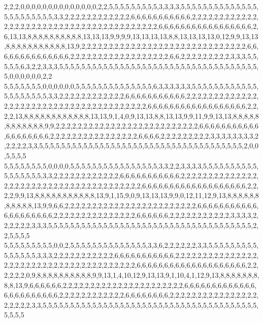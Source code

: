 2,2,2,0,0,0,0,0,0,0,0,0,0,0,0,0,0,2,2,5,5,5,5,5,5,5,5,5,3,3,3,3,5,5,5,5,5,5,5,5,5,5,5,5,5,5,5,5,5,5,5,5,5,5,5,3,3,2,2,2,2,2,2,2,2,2,2,2,2,6,6,6,6,6,6,6,6,6,6,6,2,2,2,2,2,2,2,2,2,2,2,2,2,2,2,2,2,2,2,2,2,2,2,2,2,2,2,2,2,2,2,2,2,2,2,2,2,2,2,2,6,6,6,6,6,6,6,6,6,6,6,6,6,6,6,6,6,2,6,13,13,8,8,8,8,8,8,8,8,8,8,13,13,13,9,9,9,9,13,13,13,13,8,8,13,13,13,13,0,12,9,9,13,13,8,8,8,8,8,8,8,8,8,8,8,13,9,2,2,2,2,2,2,2,2,2,2,2,2,2,2,2,2,2,2,2,2,2,2,2,2,2,2,2,2,2,2,6,6,6,6,6,6,6,6,6,6,6,6,6,6,2,2,2,2,2,2,2,2,2,2,2,2,2,2,2,2,2,2,6,6,2,2,2,2,2,2,2,2,2,3,3,3,5,5,5,5,5,6,3,2,2,3,3,3,5,5,5,5,5,5,5,5,5,5,5,5,5,5,5,5,5,5,5,5,5,5,5,5,5,5,5,5,5,5,5,5,5,5,5,5,5,0,0,0,0,0,0,2,2
5,5,5,5,5,5,5,0,0,0,0,0,0,5,5,5,5,5,5,5,5,5,5,5,5,5,5,6,3,3,3,3,3,3,5,5,5,5,5,5,5,5,5,5,5,5,5,5,5,5,5,5,5,5,3,3,2,2,2,2,2,2,2,2,2,2,2,2,6,6,6,6,6,6,6,6,6,6,6,2,2,2,2,2,2,2,2,2,2,2,2,2,2,2,2,2,2,2,2,2,2,2,2,2,2,2,2,2,2,2,2,2,2,2,2,2,2,2,6,6,6,6,6,6,6,6,6,6,6,6,6,6,6,6,6,6,2,2,2,2,13,8,8,8,8,8,8,8,8,8,8,8,8,13,13,9,1,4,0,9,13,13,8,8,13,13,9,9,11,9,9,13,13,8,8,8,8,8,8,8,8,8,8,8,8,9,9,2,2,2,2,2,2,2,2,2,2,2,2,2,2,2,2,2,2,2,2,2,2,2,2,2,2,6,6,6,6,6,6,6,6,6,6,6,6,6,6,6,6,6,6,6,2,2,2,2,2,2,2,2,2,2,2,2,2,2,2,2,6,6,6,6,2,2,2,2,2,2,2,2,2,3,3,3,3,3,3,3,3,2,2,2,2,2,3,3,5,5,5,5,5,5,5,5,5,5,5,5,5,5,5,5,5,5,5,5,5,5,5,5,5,5,5,5,5,5,5,5,5,5,5,5,5,2,0,0,5,5,5,5
5,5,5,5,5,5,5,5,0,0,0,0,5,5,5,5,5,5,5,5,5,5,5,5,5,5,5,5,3,3,2,2,3,3,3,3,5,5,5,5,5,5,5,5,5,5,5,5,5,5,5,5,5,3,3,2,2,2,2,2,2,2,2,2,2,2,2,6,6,6,6,6,6,6,6,6,6,6,2,2,2,2,2,2,2,2,2,2,2,2,2,2,2,2,2,2,2,2,2,2,2,2,2,2,2,2,2,2,2,2,2,2,2,2,2,2,2,6,6,6,6,6,6,6,6,6,6,6,6,6,6,6,6,6,6,6,2,2,2,2,9,9,13,8,8,8,8,8,8,8,8,8,8,8,13,9,1,15,9,0,9,13,13,13,9,9,0,12,11,12,9,13,8,8,8,8,8,8,8,8,8,8,8,13,9,9,6,6,2,2,2,2,2,2,2,2,2,2,2,2,2,2,2,2,2,2,2,2,2,2,2,2,6,6,6,6,6,6,6,6,6,6,6,6,6,6,6,6,6,6,6,6,2,2,2,2,2,2,2,2,2,2,2,2,2,2,2,6,6,6,6,6,6,2,2,2,2,2,2,2,2,2,2,2,3,3,3,3,2,2,2,2,2,2,3,3,3,5,5,5,5,5,5,5,5,5,5,5,5,5,5,5,5,5,5,5,5,5,5,5,5,5,5,5,5,5,5,5,5,5,5,5,5,5,2,2,5,5,5,5
5,5,5,5,5,5,5,5,5,0,0,2,5,5,5,5,5,5,5,5,5,5,5,5,5,5,3,3,6,2,2,2,2,2,2,3,3,5,5,5,5,5,5,5,5,5,5,5,5,5,5,5,3,3,3,2,2,2,2,2,2,2,2,2,2,2,6,6,6,6,6,6,6,6,6,6,6,2,2,2,2,2,2,2,2,2,2,2,2,2,2,2,2,2,2,2,2,2,2,2,2,2,2,2,2,2,2,2,2,2,2,2,2,2,2,2,6,6,6,6,6,6,6,6,6,6,6,6,6,6,6,6,6,6,6,6,2,2,2,2,2,2,0,9,8,8,8,8,8,8,8,8,8,8,9,9,13,1,4,10,12,9,13,13,9,1,10,4,1,12,9,13,8,8,8,8,8,8,8,8,8,13,9,6,6,6,6,6,6,2,2,2,2,2,2,2,2,2,2,2,2,2,2,2,2,2,2,2,2,2,2,6,6,6,6,6,6,6,6,6,6,6,6,6,6,6,6,6,6,6,6,6,6,6,2,2,2,2,2,2,2,2,2,2,2,2,6,6,6,6,6,6,6,6,2,2,2,2,2,2,2,2,2,2,2,2,2,2,2,2,2,2,2,2,2,3,3,5,5,5,5,5,5,5,5,5,5,5,5,5,5,5,5,5,5,5,5,5,5,5,5,5,5,5,5,5,5,5,5,5,5,5,5,5,5,5,5,5,5,5

